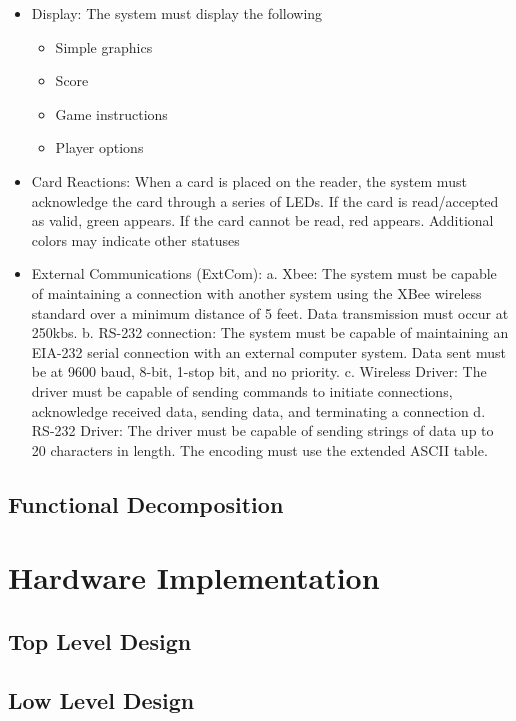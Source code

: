 \documentclass[12pt]{article} %
\begin{document}
\begin{itemize}
\begin{itemize}
			\item Display: The system must display the following
				\begin{itemize}		
					\item Simple graphics
					\item Score
					\item Game instructions
					\item Player options
				\end{itemize}
			\item Card Reactions: When a card is placed on the reader, the system must acknowledge the card through a series of LEDs. If the card is read/accepted as valid, green appears. If the card cannot be read, red appears. Additional colors may indicate other statuses
\item External Communications (ExtCom): 
a.	Xbee: The system must be capable of maintaining a connection with another system using the XBee wireless standard over a minimum distance of 5 feet. Data transmission must occur at 250kbs. 
b.	RS-232 connection: The system must be capable of maintaining an EIA-232 serial connection with an external computer system. Data sent must be at 9600 baud, 8-bit, 1-stop bit, and no priority.
c.	Wireless Driver: The driver must be capable of sending commands to initiate connections, acknowledge received data, sending data, and terminating a connection
d.	RS-232 Driver: The driver must be capable of sending strings of data up to 20 characters in length. The encoding must use the extended ASCII table.
\end{itemize}

 
\subsection{Functional Decomposition}\label{functions} %

\section{Hardware Implementation}\label{hwImplementation} 

\subsection{Top Level Design}\label{hwTopLevel} %

\subsection{Low Level Design}\label{hwLowLevel} %


\end{itemize}
\end{document}
